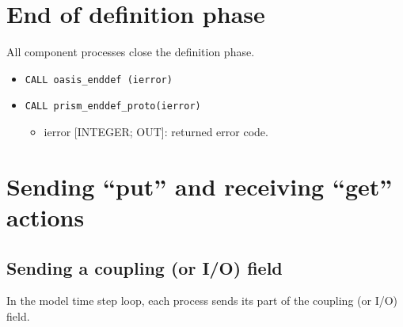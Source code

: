 \section{End of definition phase}
\label{subsubsec_Endofdefinition}
All component processes close the definition phase.
\begin{itemize}
\item {\tt CALL oasis\_enddef (ierror)}
\item {\tt CALL prism\_enddef\_proto(ierror)}
  \begin{itemize}
  \item ierror [INTEGER; OUT]: returned error code.
  \end{itemize}
\end{itemize}


\section{Sending ``put'' and receiving ``get'' actions}
\label{subsubsec_sendingreceiving}

\subsection{Sending a coupling (or I/O) field}
\label{prismput}

In the model time step loop, each process sends its part of the
coupling (or I/O) field.

